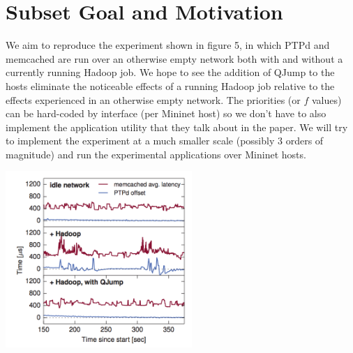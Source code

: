 \documentclass[12pt]{article}
\begin{document}
\section*{Subset Goal and Motivation}
	We aim to reproduce the experiment shown in figure 5, in which PTPd and memcached are run over an otherwise empty network both with and without a currently running Hadoop job. We hope to see the addition of QJump to the hosts eliminate the noticeable effects of a running Hadoop job relative to the effects experienced in an otherwise empty network. The priorities (or $f$ values) can be hard-coded by interface (per Mininet host) so we don't have to also implement the application utility that they talk about in the paper. We will try to implement the experiment at a much smaller scale (possibly 3 orders of magnitude) and run the experimental applications over Mininet hosts.
	
	\includegraphics[width=200pt]{qjump.png} 
	
\end{document}
